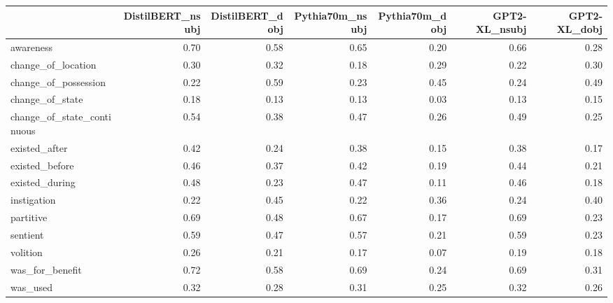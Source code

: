\begin{tabular}{lrrrrrr}
\toprule
 & DistilBERT_nsubj & DistilBERT_dobj & Pythia70m_nsubj & Pythia70m_dobj & GPT2-XL_nsubj & GPT2-XL_dobj \\
\midrule
awareness & 0.70 & 0.58 & 0.65 & 0.20 & 0.66 & 0.28 \\
change_of_location & 0.30 & 0.32 & 0.18 & 0.29 & 0.22 & 0.30 \\
change_of_possession & 0.22 & 0.59 & 0.23 & 0.45 & 0.24 & 0.49 \\
change_of_state & 0.18 & 0.13 & 0.13 & 0.03 & 0.13 & 0.15 \\
change_of_state_continuous & 0.54 & 0.38 & 0.47 & 0.26 & 0.49 & 0.25 \\
existed_after & 0.42 & 0.24 & 0.38 & 0.15 & 0.38 & 0.17 \\
existed_before & 0.46 & 0.37 & 0.42 & 0.19 & 0.44 & 0.21 \\
existed_during & 0.48 & 0.23 & 0.47 & 0.11 & 0.46 & 0.18 \\
instigation & 0.22 & 0.45 & 0.22 & 0.36 & 0.24 & 0.40 \\
partitive & 0.69 & 0.48 & 0.67 & 0.17 & 0.69 & 0.23 \\
sentient & 0.59 & 0.47 & 0.57 & 0.21 & 0.59 & 0.23 \\
volition & 0.26 & 0.21 & 0.17 & 0.07 & 0.19 & 0.18 \\
was_for_benefit & 0.72 & 0.58 & 0.69 & 0.24 & 0.69 & 0.31 \\
was_used & 0.32 & 0.28 & 0.31 & 0.25 & 0.32 & 0.26 \\
\bottomrule
\end{tabular}
